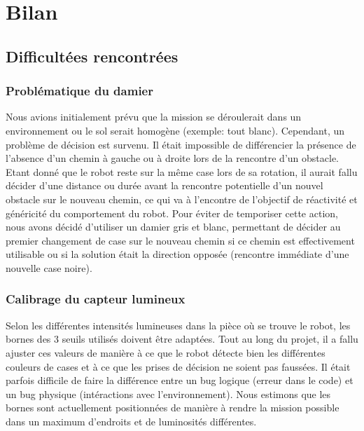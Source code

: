 \section{Bilan}

\subsection{Difficultées rencontrées}

\subsubsection{Problématique du damier}

Nous avions initialement prévu que la mission se déroulerait dans un environnement ou le sol serait homogène (exemple: tout blanc). Cependant, un problème de décision est survenu. Il était impossible de différencier la présence de l'absence d'un chemin à gauche ou à droite lors de la rencontre d'un obstacle. Etant donné que le robot reste sur la même case lors de sa rotation, il aurait fallu décider d'une distance ou durée avant la rencontre potentielle d'un nouvel obstacle sur le nouveau chemin, ce qui va à l'encontre  de l'objectif de réactivité et généricité du comportement du robot. Pour éviter de temporiser cette action, nous avons décidé d'utiliser un damier gris et blanc, permettant de décider au premier changement de case sur le nouveau chemin si ce chemin est effectivement utilisable ou si la solution était la direction opposée (rencontre immédiate d'une nouvelle case noire).

\subsubsection{Calibrage du capteur lumineux}

Selon les différentes intensités lumineuses dans la pièce où se trouve le robot, les bornes des 3 seuils utilisés doivent être adaptées. Tout au long du projet, il a fallu ajuster ces valeurs de manière à ce que le robot détecte bien les différentes couleurs de cases et à ce que les prises de décision ne soient pas faussées. Il était parfois difficile de faire la différence entre un bug logique (erreur dans le code) et un bug physique (intéractions avec l'environnement). Nous estimons que les bornes sont actuellement positionnées de manière à rendre la mission possible dans un maximum d'endroits et de luminosités différentes.

